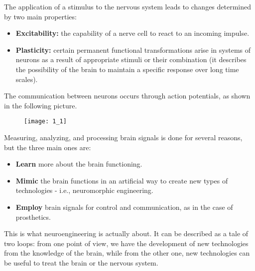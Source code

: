 The application of a stimulus to the nervous system leads to changes
determined by two main properties:
\begin{itemize}
      \item \textbf{Excitability:} the capability of a nerve cell to react
            to an incoming impulse.
      \item \textbf{Plasticity:} certain permanent functional
            transformations arise in systems of neurons as a result of appropriate
            stimuli or their combination (it describes the possibility of the brain to
            maintain a specific response over long time scales).
\end{itemize}
The communication between neurons occurs through action potentials, as
shown in the following picture.
\begin{figure}[H]
      \texttt{[image: 1\_1]}
      \centering
\end{figure}
Measuring, analyzing, and processing brain signals is done for several
reasons, but the three main ones are:
\begin{itemize}
      \item \textbf{Learn} more about the brain functioning.
      \item \textbf{Mimic} the brain functions in an artificial way to
            create new types of technologies - i.e., neuromorphic engineering.
      \item \textbf{Employ} brain signals for control and communication, as
            in the case of prosthetics.
\end{itemize}
This is what neuroengineering is actually about. It can be described as a
tale of two loops: from one point of view, we have the development of new
technologies from the knowledge of the brain, while from the other one,
new technologies can be useful to treat the brain or the nervous system.\\
